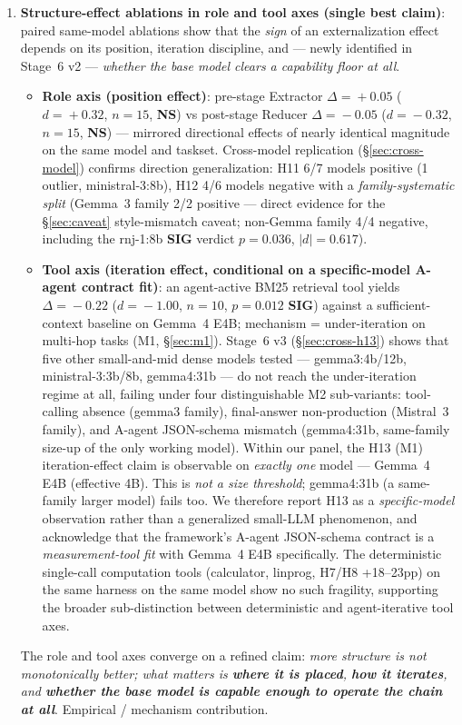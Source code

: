 \documentclass[11pt]{article}
\newcommand{\sig}{\textbf{SIG}}
\newcommand{\NS}{\textbf{NS}}
\begin{document}
\begin{enumerate}[leftmargin=*]
\item \textbf{Structure-effect ablations in role and tool axes (single best claim)}: paired same-model ablations show that the \emph{sign} of an externalization effect depends on its position, iteration discipline, and --- newly identified in Stage~6 v2 --- \emph{whether the base model clears a capability floor at all}.
\begin{itemize}
\item \textbf{Role axis (position effect)}: pre-stage Extractor $\Delta\!=\!+0.05$ ($d\!=\!+0.32$, $n\!=\!15$, \NS{}) vs post-stage Reducer $\Delta\!=\!-0.05$ ($d\!=\!-0.32$, $n\!=\!15$, \NS{}) --- mirrored directional effects of nearly identical magnitude on the same model and taskset. Cross-model replication (\S\ref{sec:cross-model}) confirms direction generalization: H11 6/7 models positive (1 outlier, ministral-3:8b), H12 4/6 models negative with a \emph{family-systematic split} (Gemma~3 family 2/2 positive --- direct evidence for the \S\ref{sec:caveat} style-mismatch caveat; non-Gemma family 4/4 negative, including the rnj-1:8b \sig{} verdict $p\!=\!0.036$, $|d|\!=\!0.617$).
\item \textbf{Tool axis (iteration effect, conditional on a specific-model A-agent contract fit)}: an agent-active BM25 retrieval tool yields $\Delta\!=\!-0.22$ ($d\!=\!-1.00$, $n\!=\!10$, $p\!=\!0.012$ \sig) against a sufficient-context baseline on Gemma~4 E4B; mechanism = under-iteration on multi-hop tasks (M1, \S\ref{sec:m1}). Stage~6 v3 (\S\ref{sec:cross-h13}) shows that five other small-and-mid dense models tested --- gemma3:4b/12b, ministral-3:3b/8b, gemma4:31b --- do not reach the under-iteration regime at all, failing under four distinguishable M2 sub-variants: tool-calling absence (gemma3 family), final-answer non-production (Mistral~3 family), and A-agent JSON-schema mismatch (gemma4:31b, same-family size-up of the only working model). Within our panel, the H13 (M1) iteration-effect claim is observable on \emph{exactly one} model --- Gemma~4 E4B (effective 4B). This is \emph{not a size threshold}; gemma4:31b (a same-family larger model) fails too. We therefore report H13 as a \emph{specific-model} observation rather than a generalized small-LLM phenomenon, and acknowledge that the framework's A-agent JSON-schema contract is a \emph{measurement-tool fit} with Gemma~4 E4B specifically. The deterministic single-call computation tools (calculator, linprog, H7/H8 +18--23pp) on the same harness on the same model show no such fragility, supporting the broader sub-distinction between deterministic and agent-iterative tool axes.
\end{itemize}
The role and tool axes converge on a refined claim: \emph{more structure is not monotonically better; what matters is \textbf{where it is placed}, \textbf{how it iterates}, and \textbf{whether the base model is capable enough to operate the chain at all}}. Empirical / mechanism contribution.


\end{enumerate}
\end{document}
